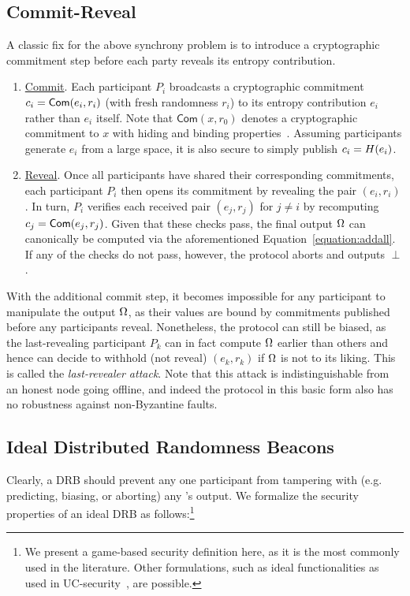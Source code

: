 \subsection{Commit-Reveal}
\label{subsection:commit-reveal}
A classic fix for the above synchrony problem is to introduce a cryptographic commitment step before each party reveals its entropy contribution.
\begin{enumerate}
\item \underline{Commit}. Each participant $P_i$ broadcasts a cryptographic commitment $c_i = \mathsf{Com}(e_i, r_i)$ (with fresh randomness $r_i$) to its entropy contribution $e_i$ rather than $e_i$ itself. Note that $\mathsf{Com}(x, r_0)$ denotes a cryptographic commitment to $x$ with hiding and binding properties~\cite{blum1983coin,damgaard1998commitment}. Assuming participants generate $e_i$ from a large space, it is also secure to simply publish $c_i = H(e_i)$.
\item \underline{Reveal}. Once all participants have shared their corresponding commitments, each participant $P_i$ then opens its commitment by revealing the pair $(e_i, r_i)$. In turn, $P_i$ verifies each received pair $(e_j, r_j)$ for $j \neq i$ by recomputing $c_j = \mathsf{Com}(e_j, r_j)$. Given that these checks pass, the final output $\Omega$ can canonically be computed via the aforementioned Equation~\ref{equation:addall}. If any of the checks do not pass, however, the protocol aborts and outputs $\perp$.
\end{enumerate}

With the additional commit step, it becomes impossible for any participant to manipulate the output $\Omega$, as their values are bound by commitments published before any participants reveal. Nonetheless, the protocol can still be biased, as the last-revealing participant $P_k$ can in fact compute $\Omega$ earlier than others and hence can decide to withhold (not reveal) $(e_k, r_k)$ if $\Omega$ is not to its liking. This is called the \textit{last-revealer attack}. Note that this attack is indistinguishable from an honest node going offline, and indeed the protocol in this basic form also has no robustness against non-Byzantine faults.

\subsection{Ideal Distributed Randomness Beacons}
Clearly, a DRB should prevent any one participant from tampering with (e.g. predicting, biasing, or aborting) any \epoch's output. %
We formalize the security properties of an ideal DRB as follows:\footnote{We present a game-based security definition here, as it is the most commonly used in the literature. Other formulations, such as ideal functionalities as used in UC-security~\cite{canetti2001universally}, are possible.}

